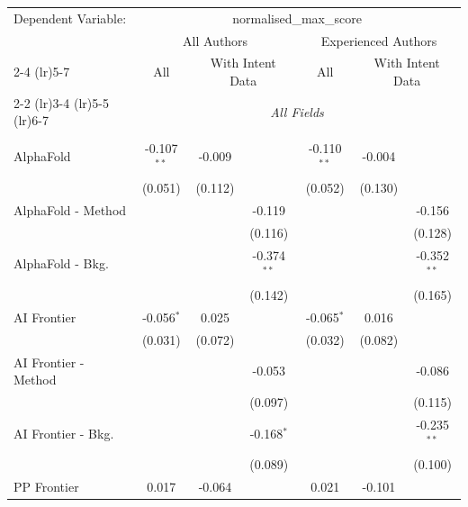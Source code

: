 \begingroup
\centering
\begin{tabular}{lcccccc}
   \tabularnewline \midrule \midrule
   Dependent Variable: & \multicolumn{6}{c}{normalised\_max\_score}\\
 & \multicolumn{3}{c}{All Authors} & \multicolumn{3}{c}{Experienced Authors} \\
\cmidrule(lr){2-4} \cmidrule(lr){5-7}
 & \multicolumn{1}{c}{All} & \multicolumn{2}{c}{With Intent Data} & \multicolumn{1}{c}{All} & \multicolumn{2}{c}{With Intent Data} \\
\cmidrule(lr){2-2} \cmidrule(lr){3-4} \cmidrule(lr){5-5} \cmidrule(lr){6-7}
 & \multicolumn{6}{c}{\textit{All Fields}} \\ \\
   AlphaFold            & -0.107$^{**}$ & -0.009  &               & -0.110$^{**}$ & -0.004  &   \\   
                        & (0.051)       & (0.112) &               & (0.052)       & (0.130) &   \\   
   AlphaFold - Method   &               &         & -0.119        &               &         & -0.156\\   
                        &               &         & (0.116)       &               &         & (0.128)\\   
   AlphaFold - Bkg.     &               &         & -0.374$^{**}$ &               &         & -0.352$^{**}$\\   
                        &               &         & (0.142)       &               &         & (0.165)\\   
   AI Frontier          & -0.056$^{*}$  & 0.025   &               & -0.065$^{*}$  & 0.016   &   \\   
                        & (0.031)       & (0.072) &               & (0.032)       & (0.082) &   \\   
   AI Frontier - Method &               &         & -0.053        &               &         & -0.086\\   
                        &               &         & (0.097)       &               &         & (0.115)\\   
   AI Frontier - Bkg.   &               &         & -0.168$^{*}$  &               &         & -0.235$^{**}$\\   
                        &               &         & (0.089)       &               &         & (0.100)\\   
   PP Frontier          & 0.017         & -0.064  &               & 0.021         & -0.101  &   \\   

\end{tabular}

